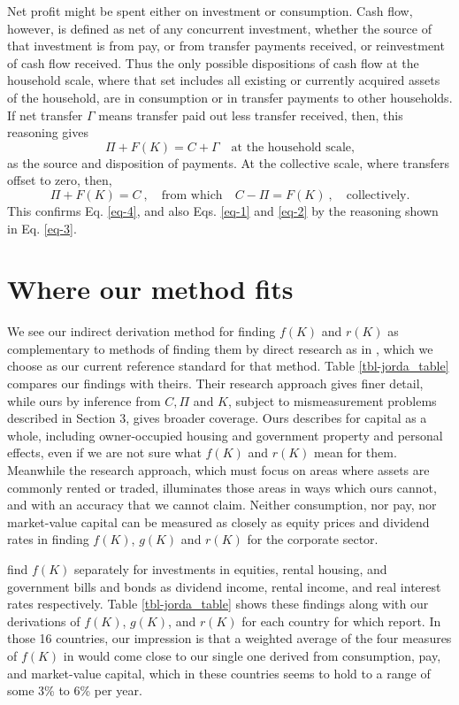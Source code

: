 \documentclass[a4paper,fleqn]{cas-sc}
\begin{document}
Net profit might be spent either on investment or consumption. Cash flow, however, is defined as net of any concurrent investment, whether the source of that investment is from pay, or from transfer payments received, or reinvestment of cash flow received. Thus the only possible dispositions of cash flow at the household scale, where that set includes all existing or currently acquired assets of the household, are in consumption or in transfer payments to other households. If net transfer $\Gamma$ means transfer paid out less transfer received, then, this reasoning gives
\begin{equation}
\Pi + F(K) = C + \Gamma \quad \text{at the household scale,} \label{eq-13}
\end{equation}
as the source and disposition of payments. At the collective scale, where transfers offset to zero, then, 
\begin{equation}
\Pi + F(K) = C \ , \quad \text{from which} \quad C - \Pi = F(K) \ , \quad \text{collectively.} \label{eq-14}
\end{equation}
This confirms Eq. \eqref{eq-4}, and also Eqs. \eqref{eq-1} and \eqref{eq-2} by the reasoning shown in Eq. \eqref{eq-3}.

\section{Where our method fits}

We see our indirect derivation method for finding \(f(K)\) and \(r(K)\) as complementary to methods of finding them by direct research as in \cite{jorda2019}, which we choose as our current reference standard for that method. Table \ref{tbl-jorda_table} compares our findings with theirs. Their research approach gives finer detail, while ours by inference from \(C,\Pi\) and \(K\), subject to mismeasurement problems described in Section 3, gives broader coverage. Ours describes for capital as a whole, including owner-occupied housing and government property and personal effects, even if we are not sure what \(f(K)\) and \(r(K)\) mean for them. Meanwhile the research approach, which must focus on areas where assets are commonly rented or traded, illuminates those areas in ways which ours cannot, and with an accuracy that we cannot claim. Neither consumption, nor pay, nor market-value capital can be measured as closely as equity prices and dividend rates in finding \(f(K)\), \(g(K)\) and \(r(K)\) for the corporate sector.

\citeauthor{jorda2019} find \(f(K)\) separately for investments in equities, rental housing, and government bills and bonds as dividend income, rental income, and real interest rates respectively. Table \ref{tbl-jorda_table} shows these findings along with our derivations of \(f(K)\), \(g(K)\), and \(r(K)\) for each country for which \citeauthor{jorda2019} report. In those 16 countries, our impression is that a weighted average of the four measures of \(f(K)\) in \citeauthor{jorda2019} would come close to our single one derived from consumption, pay, and market-value capital, which in these countries seems to hold to a range of some 3\% to 6\% per year.
\end{document}
